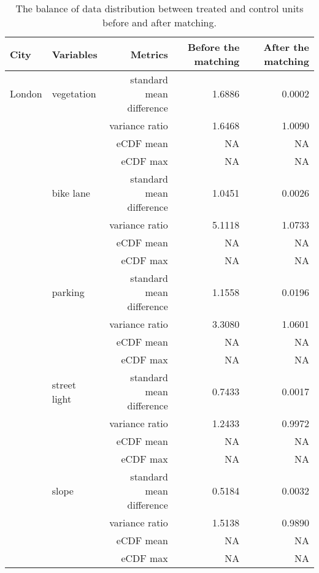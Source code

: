 \begin{table}[!htp]\centering
\caption{The balance of data distribution between treated and control units before and after matching.}\label{result:tab:match_result}
\scriptsize
\begin{tabular}{llrrr}\toprule
City&Variables&Metrics&Before the matching &After the matching \\\midrule

London & vegetation & standard mean difference & 1.6886 & \cellcolor{customgreen} 0.0002 \\
 &  & variance ratio & 1.6468 & \cellcolor{customgreen} 1.0090 \\
 &  & eCDF mean & NA &  NA \\
 &  & eCDF max & NA &  NA \\
 & bike lane & standard mean difference & 1.0451 & \cellcolor{customgreen} 0.0026 \\
 &  & variance ratio & 5.1118 & \cellcolor{customgreen} 1.0733 \\
 &  & eCDF mean & NA &  NA \\
 &  & eCDF max & NA &  NA \\
 & parking & standard mean difference & 1.1558 & \cellcolor{customgreen} 0.0196 \\
 &  & variance ratio & 3.3080 & \cellcolor{customgreen} 1.0601 \\
 &  & eCDF mean & NA &  NA \\
 &  & eCDF max & NA &  NA \\
 & street light & standard mean difference & 0.7433 & \cellcolor{customgreen} 0.0017 \\
 &  & variance ratio & 1.2433 & \cellcolor{customgreen} 0.9972 \\
 &  & eCDF mean & NA &  NA \\
 &  & eCDF max & NA &  NA \\
 & slope & standard mean difference & 0.5184 & \cellcolor{customgreen} 0.0032 \\
 &  & variance ratio & 1.5138 & \cellcolor{customgreen} 0.9890 \\
 &  & eCDF mean & NA &  NA \\
 &  & eCDF max & NA &  NA \\
\bottomrule
\end{tabular}
\end{table}

